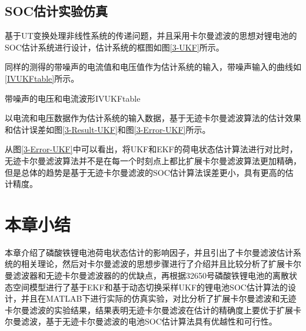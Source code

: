 \subsection{SOC估计实验仿真}
基于UT变换处理非线性系统的传递问题，并且采用卡尔曼滤波的思想对锂电池的SOC估计系统进行设计，估计系统的框图如图\ref{3-UKF}所示。

同样的测得的带噪声的电流值和电压值作为估计系统的输入，带噪声输入的曲线如\ref{IVUKFtable}所示。
\begin{pics}[htbp]{带噪声的电压和电流波形}{IVUKFtable}
\end{pics}

以电流和电压数据作为估计系统的输入数据，基于无迹卡尔曼滤波算法的估计效果和估计误差如图\ref{3-Result-UKF}和图\ref{3-Error-UKF}所示。

从图\ref{3-Error-UKF}中可以看出，将UKF和EKF的荷电状态估计算法进行对比时，无迹卡尔曼滤波算法并不是在每一个时刻点上都比扩展卡尔曼滤波算法更加精确，但是总体的趋势是基于无迹卡尔曼滤波的SOC估计算法误差更小，具有更高的估计精度。
\FloatBarrier
\section{本章小结}
本章介绍了磷酸铁锂电池荷电状态估计的影响因子，并且引出了卡尔曼滤波估计系统的相关理论，然后对卡尔曼滤波的思想步骤进行了介绍并且比较分析了扩展卡尔曼滤波器和无迹卡尔曼滤波器的的优缺点，再根据32650号磷酸铁锂电池的离散状态空间模型进行了基于EKF和基于动态切换采样UKF的锂电池SOC估计算法的设计，并且在MATLAB下进行实际的仿真实验，对比分析了扩展卡尔曼滤波和无迹卡尔曼滤波的实验结果，结果表明无迹卡尔曼滤波在估计的精确度上要优于扩展卡尔曼滤波，基于无迹卡尔曼滤波的电池SOC估计算法具有优越性和可行性。